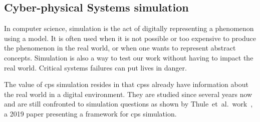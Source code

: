 \documentclass[12pt]{report}
\begin{document}
\subsection{Cyber-physical Systems simulation}
\label{sec:bg:cps:sim}
In computer science, simulation is the act of digitally representing a phenomenon using a model.
It is often used when it is not possible or too expensive to produce the phenomenon in the real world, or when one wants to represent abstract concepts. Simulation is also a way to test our work without having to impact the real world. Critical systems failures can put lives in danger.

The value of \gls{cps} simulation resides in that \gls{cps}s already have information about the real world in a digital environment.
They are studied since several years now and are still confronted to simulation questions as shown by Thule~et~al.~work~\cite{THULE201945}, a 2019 paper presenting a framework for \gls{cps} simulation.



\end{document}
